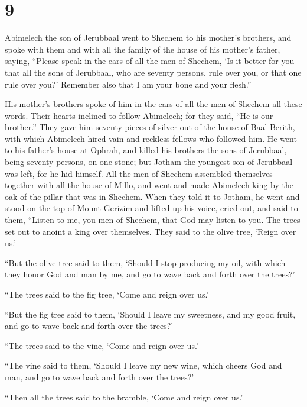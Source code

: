 \hypertarget{section-8}{%
\section{9}\label{section-8}}

 Abimelech the son of Jerubbaal went to Shechem to his
mother's brothers, and spoke with them and with all the family of the
house of his mother's father, saying,  ``Please speak in the
ears of all the men of Shechem, `Is it better for you that all the sons
of Jerubbaal, who are seventy persons, rule over you, or that one rule
over you?' Remember also that I am your bone and your flesh.''

 His mother's brothers spoke of him in the ears of all the
men of Shechem all these words. Their hearts inclined to follow
Abimelech; for they said, ``He is our brother.''  They gave
him seventy pieces of silver out of the house of Baal Berith, with which
Abimelech hired vain and reckless fellows who followed him. 
He went to his father's house at Ophrah, and killed his brothers the
sons of Jerubbaal, being seventy persons, on one stone; but Jotham the
youngest son of Jerubbaal was left, for he hid himself.  All
the men of Shechem assembled themselves together with all the house of
Millo, and went and made Abimelech king by the oak of the pillar that
was in Shechem.  When they told it to Jotham, he went and
stood on the top of Mount Gerizim and lifted up his voice, cried out,
and said to them, ``Listen to me, you men of Shechem, that God may
listen to you.  The trees set out to anoint a king over
themselves. They said to the olive tree, `Reign over us.'

 ``But the olive tree said to them, `Should I stop producing
my oil, with which they honor God and man by me, and go to wave back and
forth over the trees?'

 ``The trees said to the fig tree, `Come and reign over
us.'

 ``But the fig tree said to them, `Should I leave my
sweetness, and my good fruit, and go to wave back and forth over the
trees?'

 ``The trees said to the vine, `Come and reign over us.'

 ``The vine said to them, `Should I leave my new wine,
which cheers God and man, and go to wave back and forth over the trees?'

 ``Then all the trees said to the bramble, `Come and reign
over us.'

